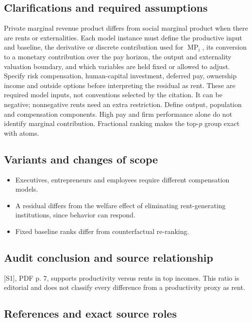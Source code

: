 \documentclass[11pt,a4paper]{article}
\begin{document}
\subsection*{Clarifications and required assumptions}

Private marginal revenue product differs from social marginal product when there are rents or externalities. Each model instance must define the productive input and baseline, the derivative or discrete contribution used for \(\operatorname{MP}_i\), its conversion to a monetary contribution over the pay horizon, the output and externality valuation boundary, and which variables are held fixed or allowed to adjust. Specify risk compensation, human-capital investment, deferred pay, ownership income and outside options before interpreting the residual as rent. These are required model inputs, not conventions selected by the citation. It can be negative; nonnegative rents need an extra restriction. Define output, population and compensation components. High pay and firm performance alone do not identify marginal contribution. Fractional ranking makes the top-\(p\) group exact with atoms.

\subsection*{Variants and changes of scope}

\begin{itemize}
\item Executives, entrepreneurs and employees require different compensation models.
\item A residual differs from the welfare effect of eliminating rent-generating institutions, since behavior can respond.
\item Fixed baseline ranks differ from counterfactual re-ranking.
\end{itemize}

\subsection*{Audit conclusion and source relationship}

[S1], PDF p. 7, supports productivity versus rents in top incomes. This ratio is editorial and does not classify every difference from a productivity proxy as rent.

\subsection*{References and exact source roles}
\end{document}
